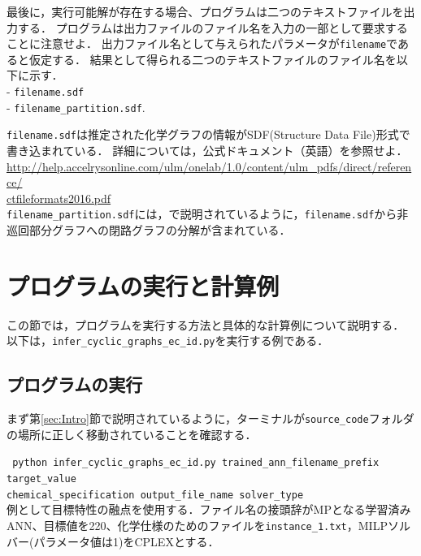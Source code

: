 \documentclass[11pt, titlepage, dvipdfmx, twoside]{jarticle}
\newcommand{\target}{目標}
\begin{document}
最後に，実行可能解が存在する場合、プログラムは二つのテキストファイルを出力する．
プログラムは出力ファイルのファイル名を入力の一部として要求することに注意せよ．
出力ファイル名として与えられたパラメータが{\tt filename}であると仮定する．
結果として得られる二つのテキストファイルのファイル名を以下に示す． \\
- {\tt filename.sdf}\\
- {\tt filename\_partition.sdf}. 

\noindent
{\tt filename.sdf}は推定された化学グラフの情報がSDF(Structure Data File)形式で書き込まれている．
詳細については，公式ドキュメント（英語）を参照せよ． \\
\url{http://help.accelrysonline.com/ulm/onelab/1.0/content/ulm_pdfs/direct/reference/}\\
\url{ctfileformats2016.pdf}\\

\noindent
{\tt filename\_partition.sdf}には，\cite{cyclic_BH_arxiv}で説明されているように，{\tt filename.sdf}から非巡回部分グラフへの閉路グラフの分解が含まれている．

\section{プログラムの実行と計算例}
\label{sec:Exp}

この節では，プログラムを実行する方法と具体的な計算例について説明する．
以下は，{\tt infer\_cyclic\_graphs\_ec\_id.py}を実行する例である．

\subsection{プログラムの実行}
\label{sec:Exp_1}

まず第\ref{sec:Intro}節で説明されているように，ターミナルが{\tt source\_code}フォルダの場所に正しく移動されていることを確認する．



\noindent
{\tt 
 python  infer\_cyclic\_graphs\_ec\_id.py 
trained\_ann\_filename\_prefix
target\_value \\
 \phantom{python }
 chemical\_specification
output\_file\_name
solver\_type
 }\\

例として\target 特性の融点を使用する．ファイル名の接頭辞がMPとなる学習済みANN、\target 値を220、化学仕様のためのファイルを{\tt instance\_1.txt}，MILPソルバー(パラメータ値は1)をCPLEX\cite{cplex}とする．
\end{document}

